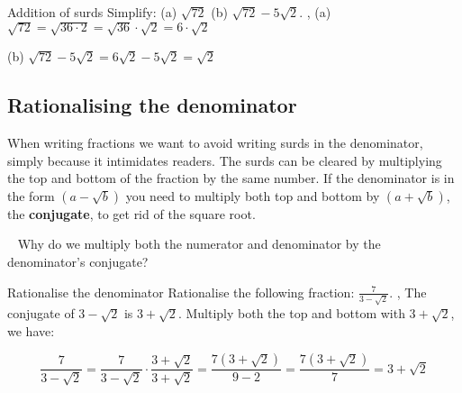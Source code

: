 \documentclass[../../main.tex]{subfiles}
\begin{document}
\begin{example}{Addition of surds}
Simplify:
(a) $\sqrt{72}$ \hspace{1cm}
(b) $\sqrt{72}-5\sqrt{2}$.
\sep
(a) $\sqrt{72}=\sqrt{36 \cdot 2}=\sqrt{36} \cdot \sqrt{2}=6 \cdot \sqrt{2}$

(b) $\sqrt{72}-5\sqrt{2}=6\sqrt{2}-5\sqrt{2}=\sqrt{2}$
\end{example}

\subsection{Rationalising the denominator}
When writing fractions we want to avoid writing surds in the denominator, simply because it intimidates readers. The surds can be cleared by multiplying the top and bottom of the fraction by the same number. If the denominator is in the form $(a-\sqrt{b})$ you need to multiply both top and bottom by $(a+\sqrt{b})$, the \textbf{conjugate}, to get rid of the square root. %
\begin{thinking}{~}
Why do we multiply both the numerator and denominator by the denominator's conjugate?
\end{thinking}
\begin{example}{Rationalise the denominator}
Rationalise the following fraction: $\frac{7}{3-\sqrt{2}}$.
\sep
The conjugate of $3-\sqrt{2}$ is $3+\sqrt{2}$.
Multiply both the top and bottom with $3+\sqrt{2}$, we have:

\[ \frac{7}{3-\sqrt{2}}=\frac{7}{3-\sqrt{2}} \cdot \frac{3+\sqrt{2}}{3+\sqrt{2}}=\frac{7\left(3+\sqrt{2}\right)}{9-2}=\frac{7\left(3+\sqrt{2}\right)}{7}=3+\sqrt{2} \]
\end{example}
\end{document}
